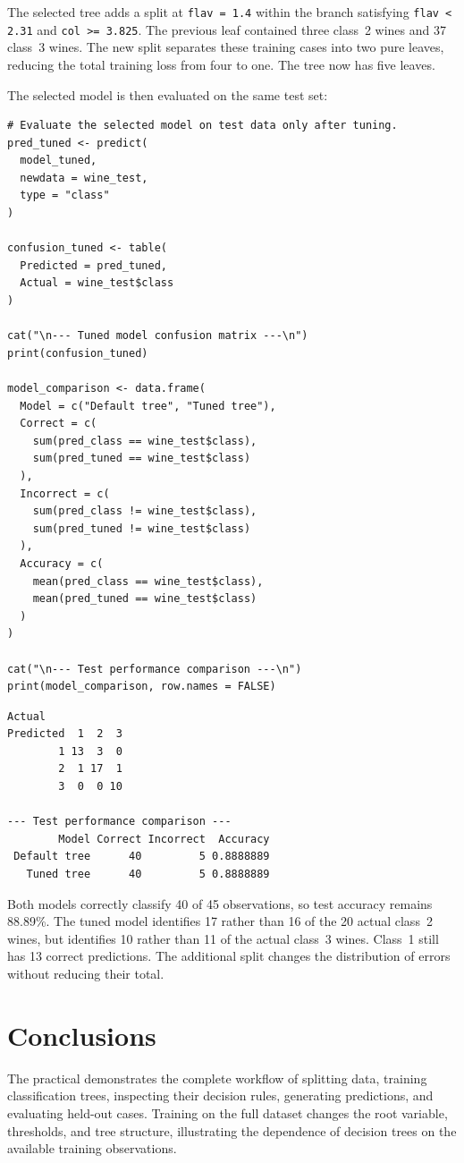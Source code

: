 \documentclass[11pt,a4paper]{article}
\begin{document}
The selected tree adds a split at \texttt{flav = 1.4} within the branch satisfying \texttt{flav < 2.31} and \texttt{col >= 3.825}. The previous leaf contained three class~2 wines and 37 class~3 wines. The new split separates these training cases into two pure leaves, reducing the total training loss from four to one. The tree now has five leaves.

The selected model is then evaluated on the same test set:
\begin{lstlisting}
# Evaluate the selected model on test data only after tuning.
pred_tuned <- predict(
  model_tuned,
  newdata = wine_test,
  type = "class"
)

confusion_tuned <- table(
  Predicted = pred_tuned,
  Actual = wine_test$class
)

cat("\n--- Tuned model confusion matrix ---\n")
print(confusion_tuned)

model_comparison <- data.frame(
  Model = c("Default tree", "Tuned tree"),
  Correct = c(
    sum(pred_class == wine_test$class),
    sum(pred_tuned == wine_test$class)
  ),
  Incorrect = c(
    sum(pred_class != wine_test$class),
    sum(pred_tuned != wine_test$class)
  ),
  Accuracy = c(
    mean(pred_class == wine_test$class),
    mean(pred_tuned == wine_test$class)
  )
)

cat("\n--- Test performance comparison ---\n")
print(model_comparison, row.names = FALSE)
\end{lstlisting}
\par\noindent\begin{minipage}{\linewidth}
  \begin{lstlisting}[style=console]
Actual
Predicted  1  2  3
        1 13  3  0
        2  1 17  1
        3  0  0 10

--- Test performance comparison ---
        Model Correct Incorrect  Accuracy
 Default tree      40         5 0.8888889
   Tuned tree      40         5 0.8888889
\end{lstlisting}
\end{minipage}\par

Both models correctly classify 40 of 45 observations, so test accuracy remains 88.89\%. The tuned model identifies 17 rather than 16 of the 20 actual class~2 wines, but identifies 10 rather than 11 of the actual class~3 wines. Class~1 still has 13 correct predictions. The additional split changes the distribution of errors without reducing their total.

\section{Conclusions}
The practical demonstrates the complete workflow of splitting data, training classification trees, inspecting their decision rules, generating predictions, and evaluating held-out cases. Training on the full dataset changes the root variable, thresholds, and tree structure, illustrating the dependence of decision trees on the available training observations.
\end{document}

